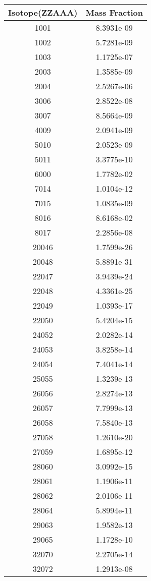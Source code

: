 \begin{table}[h!]
\centering
\begin{tabular}{|| c || c |}
\hline
Isotope(ZZAAA) & Mass Fraction \\
\hline \hline

1001 & 8.3931e-09 \\
1002 & 5.7281e-09 \\
1003 & 1.1725e-07 \\
2003 & 1.3585e-09 \\
2004 & 2.5267e-06 \\
3006 & 2.8522e-08 \\
3007 & 8.5664e-09 \\
4009 & 2.0941e-09 \\
5010 & 2.0523e-09 \\
5011 & 3.3775e-10 \\
6000 & 1.7782e-02 \\
7014 & 1.0104e-12 \\
7015 & 1.0835e-09 \\
8016 & 8.6168e-02 \\
8017 & 2.2856e-08 \\
20046 & 1.7599e-26 \\
20048 & 5.8891e-31 \\
22047 & 3.9439e-24 \\
22048 & 4.3361e-25 \\
22049 & 1.0393e-17 \\
22050 & 5.4204e-15 \\
24052 & 2.0282e-14 \\
24053 & 3.8258e-14 \\
24054 & 7.4041e-14 \\
25055 & 1.3239e-13 \\
26056 & 2.8274e-13 \\
26057 & 7.7999e-13 \\
26058 & 7.5840e-13 \\
27058 & 1.2610e-20 \\
27059 & 1.6895e-12 \\
28060 & 3.0992e-15 \\
28061 & 1.1906e-11 \\
28062 & 2.0106e-11 \\
28064 & 5.8994e-11 \\
29063 & 1.9582e-13 \\
29065 & 1.1728e-10 \\
32070 & 2.2705e-14 \\
32072 & 1.2913e-08 \\

\end{tabular}
\end{table}
